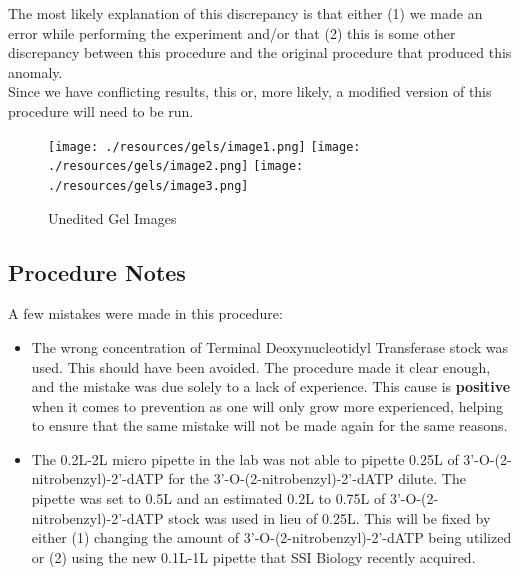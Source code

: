 \documentclass[letterpaper]{article}
\newcommand{\tdt}{Terminal Deoxynucleotidyl Transferase}
\newcommand{\uL}{\micro{}L}
\newcommand{\BdATP}{3'-O-(2-nitrobenzyl)-2'-dATP}
\begin{document}
The most likely explanation of this discrepancy is that either (1) we made an error while performing the experiment and/or that (2) this is some other discrepancy between this procedure and the original procedure that produced this anomaly. \\

Since we have conflicting results, this or, more likely, a modified version of this procedure will need to be run.


\begin{figure}
\begin{center}

\texttt{[image: ./resources/gels/image1.png]}
\texttt{[image: ./resources/gels/image2.png]}
\texttt{[image: ./resources/gels/image3.png]}

\label{gels3}
\caption{Unedited Gel Images}
\end{center}
\end{figure}
\clearpage
\subsection{Procedure Notes}
A few mistakes were made in this procedure:
\begin{itemize}
	\item{The wrong concentration of \tdt{} stock was used. This should have been avoided. The procedure made it clear enough, and the mistake was due solely to a lack of experience. This cause is \textbf{positive} when it comes to prevention as one will only grow more experienced, helping to ensure that the same mistake will not be made again for the same reasons.}
	\item{The 0.2\uL{}-2\uL{} micro pipette in the lab was not able to pipette 0.25\uL{} of \BdATP{} for the \BdATP{} dilute. The pipette was set to 0.5\uL{} and an estimated 0.2\uL{} to 0.75\uL{} of \BdATP{} stock was used in lieu of 0.25\uL{}. This will be fixed by either (1) changing the amount of \BdATP{} being utilized or (2) using the new 0.1\uL{}-1\uL{} pipette that SSI Biology recently acquired.}
\end{itemize}
\listoffigures
\listoftodos


\end{document}
